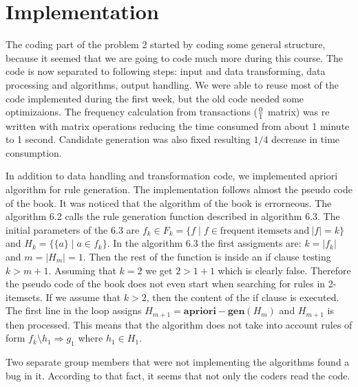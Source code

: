 \section{Implementation}
The coding part of the problem 2 started by coding some general structure, because 
it seemed that we are going to code much more during this course. The code is now
separated to following steps: input and data transforming, data processing and algorithms, output handling.
We were able to reuse most of the code implemented during the first week, but the old
code needed some optimizaions. The frequency calculation from transactions ($0 \over 1$ matrix) was re written with matrix operations
reducing the time consumed from about 1 minute to 1 second. Candidate generation was
also fixed resulting $1/4$ decrease in time consumption.\newline

In addition to data handling and transformation code, we implemented apriori algorithm 
for rule generation. The implementation follows almost the pseudo code of the book. 
It was noticed that the algorithm of the book is errorneous. 
The algorithm 6.2 calls the rule generation function described in algorithm 6.3.
The initial parameters of the 6.3 are $f_k \in F_k = \{f \mid f \in \mathrm{frequent\ itemsets\ and\ } |f|=k \}$ 
and $H_k = \{\{a\} \mid a \in f_k \}$. In the algorithm 6.3 the first assigments are:
$k = |f_k|$ and $m = |H_m| = 1$. Then the rest of the function is inside an if clause
testing $k > m + 1$. Assuming that $k=2$ we get $2 > 1+1$ which is clearly false. 
Therefore the pseudo code of the book does not even start when searching for rules in 2-itemsets.
If we assume that $k>2$, then the content of the if clause is executed. The first 
line in the loop assigns $H_{m+1} = \mathbf{apriori-gen}(H_m)$ and $H_{m+1}$ is then processed.
This means that the algorithm does not take into account rules of form $f_k \setminus h_1 \Rightarrow g_1$ where $h_1 \in H_1$.
\newline

Two separate group members that were not implementing the algorithms found a bug in it. 
According to that fact, it seems that not only the coders read the code.
